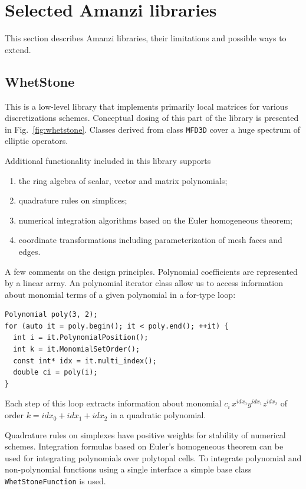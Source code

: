 \section{Selected Amanzi libraries}

This section describes Amanzi libraries, their limitations and possible 
ways to extend.

\subsection{WhetStone}
This is a low-level library that implements primarily local matrices for 
various discretizations schemes. 
Conceptual dosing of this part of the library is presented in Fig.~\ref{fig:whetstone}.
Classes derived from class {\tt MFD3D} cover a huge spectrum of elliptic
operators.

Additional functionality included in this library supports
\begin{enumerate}
\item the ring algebra of scalar, vector and matrix polynomials;
\item quadrature rules on simplices;
\item numerical integration algorithms based on the Euler homogeneous theorem;
\item coordinate transformations including parameterization of mesh faces and edges.
\end{enumerate}

A few  comments on the design principles. 
Polynomial coefficients are represented by a linear array. 
An polynomial iterator class allow us to access information about monomial terms of 
a given polynomial in a for-type loop:
\begin{lstlisting}
Polynomial poly(3, 2);
for (auto it = poly.begin(); it < poly.end(); ++it) {
  int i = it.PolynomialPosition();
  int k = it.MonomialSetOrder();
  const int* idx = it.multi_index();
  double ci = poly(i);
}
\end{lstlisting}
Each step of this loop extracts information about monomial $c_i \,x^{idx_0} y^{idx_1} z^{idx_2}$
of order $k= idx_0 + idx_1 + idx_2$ in a quadratic polynomial.

Quadrature rules on simplexes have positive weights for stability of numerical schemes. 
Integration formulas based on Euler's homogeneous theorem can be used for integrating
polynomials over polytopal cells.
To integrate polynomial and non-polynomial functions using a single interface a simple
base class {\tt WhetStoneFunction} is used.


